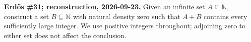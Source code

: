 \textbf{Erd\H{o}s \#31; reconstruction, 2026-09-23.}
Given an infinite set $A\subseteq\mathbb N$, construct a set
$B\subseteq\mathbb N$ with natural density zero such that $A+B$
contains every sufficiently large integer. We use positive integers
throughout; adjoining zero to either set does not affect the conclusion.
